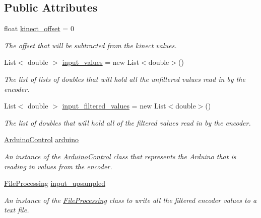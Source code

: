 \subsection*{Public Attributes}
\begin{DoxyCompactItemize}
\item 
float \hyperlink{classkinect_expirement_1_1_encoder_sensor_class_a70bb049741404bcfcce7e78a43739e33}{kinect\+\_\+offset} = 0
\begin{DoxyCompactList}\small\item\em The offset that will be subtracted from the kinect values. \end{DoxyCompactList}\item 
List$<$ double $>$ \hyperlink{classkinect_expirement_1_1_encoder_sensor_class_ae6c3bb0efe3e841b985741bfa35dc8aa}{input\+\_\+values} = new List$<$double$>$()
\begin{DoxyCompactList}\small\item\em The list of lists of doubles that will hold all the unfiltered values read in by the encoder. \end{DoxyCompactList}\item 
List$<$ double $>$ \hyperlink{classkinect_expirement_1_1_encoder_sensor_class_a19b9e4e6fe72872dcab2c82a91470c3a}{input\+\_\+filtered\+\_\+values} = new List$<$double$>$()
\begin{DoxyCompactList}\small\item\em The list of doubles that will hold all of the filtered values read in by the encoder. \end{DoxyCompactList}\item 
\hyperlink{classkinect_expirement_1_1_arduino_control}{Arduino\+Control} \hyperlink{classkinect_expirement_1_1_encoder_sensor_class_a5581b60b2dc6c9311ae5318772aa92f1}{arduino}
\begin{DoxyCompactList}\small\item\em An instance of the {\ttfamily \hyperlink{classkinect_expirement_1_1_arduino_control}{Arduino\+Control}} class that represents the Arduino that is reading in values from the encoder. \end{DoxyCompactList}\item 
\hyperlink{classkinect_expirement_1_1_file_processing}{File\+Processing} \hyperlink{classkinect_expirement_1_1_encoder_sensor_class_a71c4a0ef65acb2048fc85ff7ecb3f79f}{input\+\_\+upsampled}
\begin{DoxyCompactList}\small\item\em An instance of the {\ttfamily \hyperlink{classkinect_expirement_1_1_file_processing}{File\+Processing}} class to write all the filtered encoder values to a text file. \end{DoxyCompactList}\item 

\end{DoxyCompactItemize}
